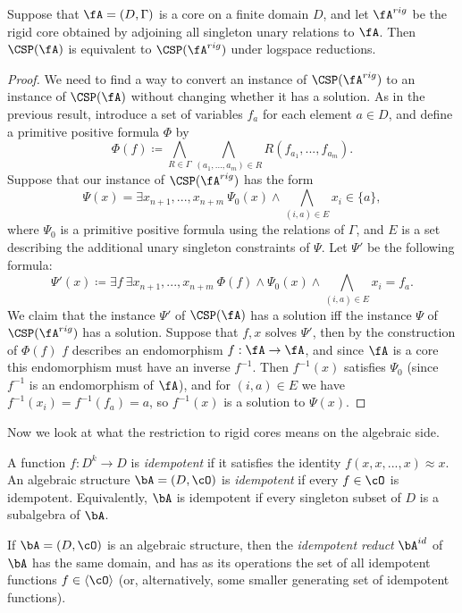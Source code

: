 \begin{thm}\label{rigid-core-reduction} Suppose that $\fA = (D, \Gamma)$ is a core on a finite domain $D$, and let $\fA^{rig}$ be the rigid core obtained by adjoining all singleton unary relations to $\fA$. Then $\CSP(\fA)$ is equivalent to $\CSP(\fA^{rig})$ under logspace reductions.
\end{thm}
\begin{proof} We need to find a way to convert an instance of $\CSP(\fA^{rig})$ to an instance of $\CSP(\fA)$ without changing whether it has a solution. As in the previous result, introduce a set of variables $f_a$ for each element $a \in D$, and define a primitive positive formula $\Phi$ by
\[
\Phi(f) \coloneqq \bigwedge_{R \in \Gamma} \bigwedge_{(a_1, ..., a_m) \in R} R(f_{a_1}, ..., f_{a_m}).
\]
Suppose that our instance of $\CSP(\fA^{rig})$ has the form
\[
\Psi(x) = \exists x_{n+1}, ..., x_{n+m}\ \Psi_0(x) \wedge \bigwedge_{(i,a) \in E} x_i \in \{a\},
\]
where $\Psi_0$ is a primitive positive formula using the relations of $\Gamma$, and $E$ is a set describing the additional unary singleton constraints of $\Psi$. Let $\Psi'$ be the following formula:
\[
\Psi'(x) \coloneqq \exists f\ \exists x_{n+1}, ..., x_{n+m}\ \Phi(f) \wedge \Psi_0(x) \wedge \bigwedge_{(i,a) \in E} x_i = f_{a}.
\]
We claim that the instance $\Psi'$ of $\CSP(\fA)$ has a solution iff the instance $\Psi$ of $\CSP(\fA^{rig})$ has a solution. Suppose that $f,x$ solves $\Psi'$, then by the construction of $\Phi(f)$ $f$ describes an endomorphism $f : \fA \rightarrow \fA$, and since $\fA$ is a core this endomorphism must have an inverse $f^{-1}$. Then $f^{-1}(x)$ satisfies $\Psi_0$ (since $f^{-1}$ is an endomorphism of $\fA$), and for $(i,a) \in E$ we have $f^{-1}(x_i) = f^{-1}(f_{a}) = a$, so $f^{-1}(x)$ is a solution to $\Psi(x)$.
\end{proof}

Now we look at what the restriction to rigid cores means on the algebraic side.

\begin{defn} A function $f : D^k \rightarrow D$ is \emph{idempotent} if it satisfies the identity $f(x, x, ..., x) \approx x$. An algebraic structure $\bA = (D, \cO)$ is \emph{idempotent} if every $f \in \cO$ is idempotent. Equivalently, $\bA$ is idempotent if every singleton subset of $D$ is a subalgebra of $\bA$.
\end{defn}

\begin{defn} If $\bA = (D, \cO)$ is an algebraic structure, then the \emph{idempotent reduct} $\bA^{id}$ of $\bA$ has the same domain, and has as its operations the set of all idempotent functions $f \in \langle \cO \rangle$ (or, alternatively, some smaller generating set of idempotent functions).
\end{defn}

